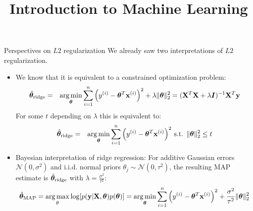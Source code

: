 \documentclass[11pt,compress,t,notes=noshow, xcolor=table]{beamer}
\title{Introduction to Machine Learning}
\begin{document}




\begin{vbframe}{Perspectives on $L2$ regularization}
We already saw two interpretations of $L2$ regularization. 
{\small
\begin{itemize}\setlength\itemsep{0.8em}
\item We know that it is equivalent to a constrained optimization problem:
  \begin{eqnarray*}  
  \hat{\bm{\theta}}_{\text{ridge}} &=& \operatorname*{arg\,min}_{\bm{\theta}} \sum\limits_{i=1}^n \left(y^{(i)} - \bm{\theta}^T \mathbf{x}^{(i)} \right)^2 + \lambda \|\bm{\theta}\|_2^2 = ({\mathbf{X}}^T \mathbf{X}  + \lambda \boldsymbol{I})^{-1} \mathbf{X}^T\mathbf{y}\\
 \end{eqnarray*}
  For some $t$ depending on $\lambda$ this is equivalent to:
  \begin{eqnarray*}
  \hat{\bm{\theta}}_{\text{ridge}}&=& \operatorname*{arg\,min}_{\bm{\theta}} \sum\limits_{i=1}^n \left(y^{(i)} - \bm{\theta}^T \mathbf{x}^{(i)}\right)^2 \,
  \text{s.t. } \|\bm{\theta}\|_2^2  \leq t
  \end{eqnarray*}
  \item Bayesian interpretation of ridge regression: For additive Gaussian errors $\mathcal{N}(0,\sigma^2)$ and i.i.d. normal priors $\theta_j \sim \mathcal{N}(0,\tau^{2})$, the resulting MAP estimate is $\hat{\bm{\theta}}_{\text{ridge}}$ with $\lambda=\frac{\sigma^2}{\tau^2}$:
  $$\hat{\bm{\theta}}_{\text{MAP}}=\operatorname*{arg\,max}_{\theta} \log[p(\mathbf{y}|\mathbf{X},\bm{\theta})p(\bm{\theta})] = \operatorname*{arg\,min}_{\bm{\theta}} \sum\limits_{i=1}^n \left(y^{(i)} - \bm{\theta}^T \mathbf{x}^{(i)} \right)^2 + \frac{\sigma^2}{\tau^2} \|\bm{\theta}\|_2^2$$
\end{itemize}
}
\end{vbframe}
\end{document}

